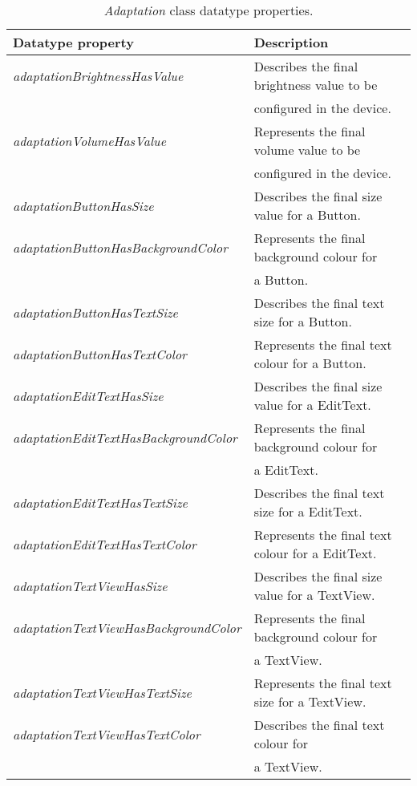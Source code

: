 \begin{table}
  \caption{\textit{Adaptation} class datatype properties.}
 \label{tbl:adaptation_properties}
\footnotesize
\centering
 \begin{tabular}{l l}
  \hline 
  \textbf{Datatype property} 			& \textbf{Description}				\\
  \hline
  \textit{adaptationBrightnessHasValue}		& Describes the final brightness value to be 	\\
						& configured in the device. 			\\
  \textit{adaptationVolumeHasValue}		& Represents the final volume value to be 	\\
						& configured in the device. 			\\
  \textit{adaptationButtonHasSize}		& Describes the final size value for a Button. 	\\
  \textit{adaptationButtonHasBackgroundColor}	& Represents the final background colour for 	\\
						& a Button.					\\
  \textit{adaptationButtonHasTextSize}		& Describes the final text size for a Button.	\\
  \textit{adaptationButtonHasTextColor}		& Represents the final text colour for a Button.\\
  \textit{adaptationEditTextHasSize}		& Describes the final size value for a EditText.\\
  \textit{adaptationEditTextHasBackgroundColor}	& Represents the final background colour for 	\\ 
						& a EditText.					\\
  \textit{adaptationEditTextHasTextSize}	& Describes the final text size for a EditText.	\\
  \textit{adaptationEditTextHasTextColor}	& Represents the final text colour for a EditText.\\
  \textit{adaptationTextViewHasSize}		& Describes the final size value for a TextView.\\
  \textit{adaptationTextViewHasBackgroundColor}	& Represents the final background colour for 	\\
						& a TextView.					\\
  \textit{adaptationTextViewHasTextSize}	& Represents the final text size for a TextView.\\
  \textit{adaptationTextViewHasTextColor}	& Describes the final text colour for 		\\
						& a TextView.		 			\\
  \hline
  
\end{tabular}
\end{table}


